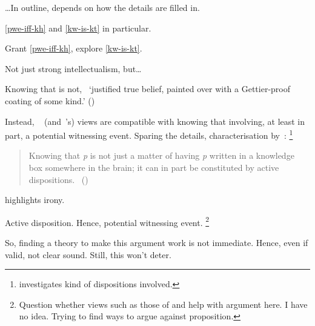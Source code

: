 \begin{note}
  \dots In outline, depends on how the details are filled in.

  \autoref{pwe-iff-kh} and \autoref{kw-is-kt} in particular.

  Grant \autoref{pwe-iff-kh}, explore \autoref{kw-is-kt}.
\end{note}

\begin{note}
  Not just strong intellectualism, but\dots

  Knowing that is not,~\cite{Stalnaker:2012tp} `justiﬁed true belief, painted over with a Gettier-proof coating of some kind.' (\citeyear[754]{Stalnaker:2012tp})

  Instead, ~\citeauthor{Stanley:2011ut} (and~\citeauthor{Stalnaker:2012tp}'s) views are compatible with knowing that involving, at least in part, a potential witnessing event.
  Sparing the details, characterisation by~\citeauthor{Weatherson:2017tb}:%
  \footnote{
    \textcite{Weatherson:2017tb} investigates kind of dispositions involved.
  }

  \nocite{Stanley:2012wg}
  \begin{quote}
    Knowing that \emph{p} is not just a matter of having \emph{p} written in a knowledge box somewhere in the brain; it can in part be constituted by active dispositions.%
    \mbox{ }\hfill\mbox{(\citeyear[8]{Weatherson:2017tb})}
  \end{quote}

  \citeauthor{Stalnaker:2012tp} highlights irony.

  Active disposition.
  Hence, potential witnessing event.%
  \footnote{
    Question whether views such as those of \cite{Stalnaker:2012tp} and \citeauthor{Stanley:2011ut} help with argument here.
    I have no idea.
    Trying to find ways to argue against proposition.
  }
\end{note}

\begin{note}
  So, finding a theory to make this argument work is not immediate.
  Hence, even if valid, not clear sound.
  Still, this won't deter.
\end{note}


